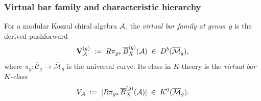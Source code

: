\subsubsection{Virtual bar family and characteristic hierarchy}
\label{subsubsec:virtual-bar-k-class}

\begin{definition}
\label{def:virtual-bar-k-class}
For a modular Koszul chiral algebra $\mathcal{A}$, the
\emph{virtual bar family at genus~$g$} is the derived pushforward
\begin{equation}\label{eq:virtual-bar-k-class}
\mathbf{V}_{\mathcal{A}}^{(g)}
\;:=\;
R\pi_{g*}\, \overline{B}^{(g)}_X(\mathcal{A})
\;\in\; D^b(\overline{\mathcal{M}}_g),
\end{equation}
where $\pi_g\colon \overline{\mathcal{C}}_g \to
\overline{\mathcal{M}}_g$ is the universal curve.  Its class in
$K$-theory is the \emph{virtual bar $K$-class}
\begin{equation}\label{eq:V-A-K-class}
V_{\mathcal{A}}
\;:=\;
[R\pi_{g*}\, \overline{B}^{(g)}_X(\mathcal{A})]
\;\in\; K^0(\overline{\mathcal{M}}_g).
\end{equation}
\end{definition}

